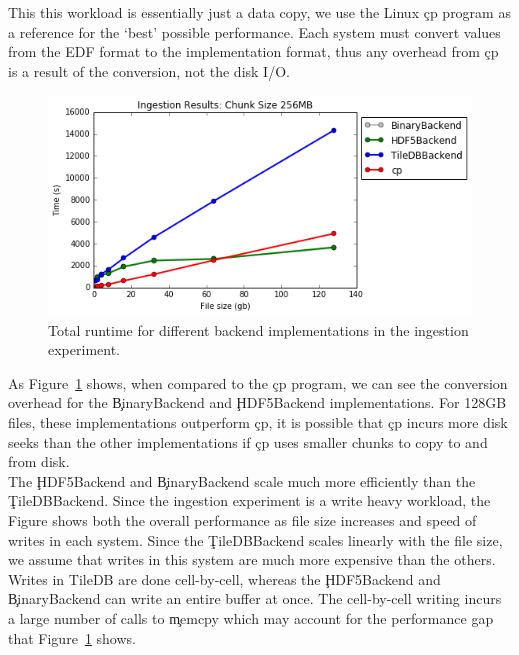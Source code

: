 This this workload is essentially just a data copy, we use the Linux \c{cp}
program as a reference for the `best' possible performance. Each system must
convert values from the EDF format to the implementation format, thus any
overhead from \c{cp} is a result of the conversion, not the disk I/O. \\

\begin{figure}[h]
\begin{center}
\includegraphics[scale=.75]{./img/ingestion-exp.png}
\caption{Total runtime for different backend implementations in the ingestion
  experiment.}
\label{fig:ingestion-exp}
\end{center}
\end{figure}

As Figure~\ref{fig:ingestion-exp} shows, when compared to the \c{cp} program,
we can see the conversion overhead for the \c{BinaryBackend} and
\c{HDF5Backend} implementations. For 128GB files, these implementations
outperform \c{cp}, it is possible that \c{cp} incurs more disk seeks than the
other implementations if \c{cp} uses smaller chunks to copy to and from disk.
\\

The \c{HDF5Backend} and \c{BinaryBackend} scale much more efficiently than the
\c{TileDBBackend}. Since the ingestion experiment is a write heavy workload,
the Figure shows both the overall performance as file size increases and speed
of writes in each system.  Since the \c{TileDBBackend} scales linearly with the
file size, we assume that writes in this system are much more expensive than
the others. \\

Writes in TileDB are done cell-by-cell, whereas the \c{HDF5Backend} and
\c{BinaryBackend} can write an entire buffer at once. The cell-by-cell writing
incurs a large number of calls to \c{memcpy} which may account for the
performance gap that Figure~\ref{fig:ingestion-exp} shows. \\

